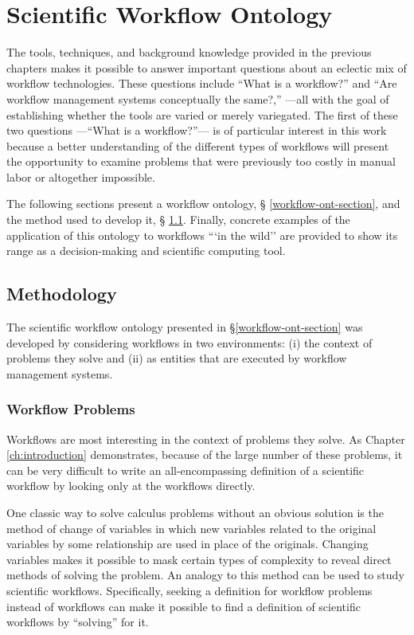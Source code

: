 \chapter{Scientific Workflow Ontology}
\label{ch:workflow-ontology}

The tools, techniques, and background knowledge provided in the previous
chapters makes it possible to answer important questions about an eclectic mix
of workflow technologies. These questions include ``What is a workflow?'' and
``Are workflow management systems conceptually the same?,'' ---all with the goal
of establishing whether the tools are varied or merely variegated. The first of
these two questions ---``What is a workflow?''--- is of particular interest in
this work because a better understanding of the different types of workflows will
present the opportunity to examine problems that were previously too costly in
manual labor or altogether impossible.

The following sections present a workflow ontology, \S
\ref{workflow-ont-section}, and the method used to develop it, \S
\ref{workflow-ont-method}. Finally, concrete examples of the application of this
ontology to workflows ```in the wild'' are provided to show its range as a
decision-making and scientific computing tool.

\section{Methodology}
\label{workflow-ont-method}


The scientific workflow ontology presented in \S \ref{workflow-ont-section} was
developed by considering workflows in two environments: (i) the context
of problems they solve and (ii) as entities that are executed by workflow
management systems.

\subsection{Workflow Problems}

Workflows are most interesting in the context of problems they solve. As
Chapter \ref{ch:introduction} demonstrates, because of the large number of these
problems, it can be very difficult to write an all-encompassing
definition of a scientific workflow by looking only at the workflows directly. 

One classic way to solve calculus problems without an obvious solution is the
method of change of variables in which new variables related to the original
variables by some relationship are used in place of the originals. Changing
variables makes it possible to mask certain types of complexity to reveal direct
methods of solving the problem. An analogy to this method can be used to study
scientific workflows. Specifically, seeking a definition for workflow problems
instead of workflows can make it possible to find a definition of scientific
workflows by ``solving'' for it. 

